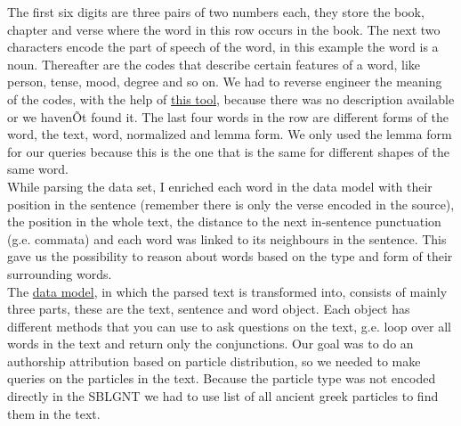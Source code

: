 \documentclass[a4paper]{article}
\begin{document}
The first six digits are three pairs of two numbers each, they store the book, chapter and verse where the word in this row occurs in the book. The next two characters encode the part of speech of the word, in this example the word is a noun. Thereafter are the codes that describe certain features of a word, like person, tense, mood, degree and so on. We had to reverse engineer the meaning of the codes, with the help of  \href{http://jtauber.com/2010/07/parse-helper/demo.html}{this tool}, because there was no description available or we havenÕt found it. The last four words in the row are different forms of the word, the text, word, normalized and lemma form. We only used the lemma form for our queries because this is the one that is the same for different shapes of the same word. \\

While parsing the data set, I enriched each word in the data model with their position in the sentence (remember there is only the verse encoded in the source), the position in the whole text, the distance to the next in-sentence punctuation (g.e. commata) and each word was linked to its neighbours in the sentence. This gave us the possibility to reason about words based on the type and form of their surrounding words.  \\

The \href{https://github.com/KLINGTdotNET/sblgntparser/blob/master/sblgntparser/model.py}{data model}, in which the parsed text is transformed into, consists of mainly three parts, these are the text, sentence and word object. Each object has different methods that you can use to ask questions on the text, g.e. loop over all words in the text and return only the conjunctions. Our goal was to do an authorship attribution based on particle distribution, so we needed to make queries on the particles in the text. Because the particle type was not encoded directly in the SBLGNT we had to use list of all ancient greek particles to find them in the text. 

\newpage
\end{document}
